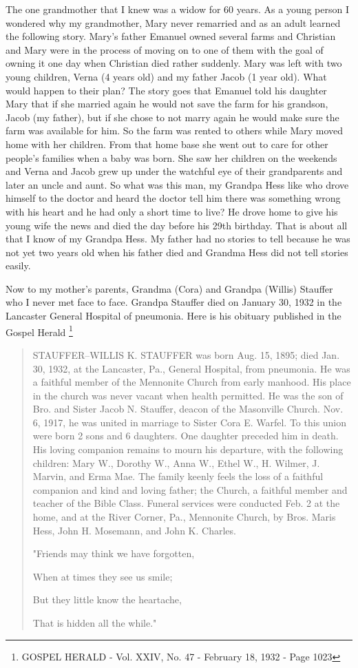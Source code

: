 The one grandmother that I knew was a widow for 60 years.  As a young person I wondered why my grandmother, Mary never remarried and as an adult learned the following story. Mary's father Emanuel owned several farms and Christian and Mary were in the process of moving on to one of them with the goal of owning it one day when Christian died rather suddenly. Mary was left with two young children, Verna (4 years old) and my father Jacob (1 year old). What would happen to their plan? The story goes that Emanuel told his daughter Mary that if she married again he would not save the farm for his grandson, Jacob (my father), but if she chose to not marry again he would make sure the farm was available for him.  So the farm was rented to others while Mary moved home with her children.  From that home base she went out to care for other people's families when a baby was born.  She saw her children on the weekends and Verna and Jacob grew up under the watchful eye of their grandparents and later an uncle and aunt.
So what was this man, my Grandpa Hess like who drove himself to the doctor and heard the doctor tell him there was something wrong with his heart and he had only a short time to live? He drove home to give his young wife the news and died the day before his 29th birthday. That is about all that I know of my Grandpa Hess. My father had no stories to tell because he was not yet two years old when his father died and Grandma Hess did not tell stories easily. 

Now to my mother's parents, Grandma (Cora) and Grandpa (Willis) Stauffer who I never met face to face. Grandpa Stauffer died on January 30, 1932 in the Lancaster General Hospital of pneumonia. Here is his obituary published in the Gospel Herald \footnote{GOSPEL HERALD - Vol. XXIV, No. 47 - February 18, 1932 - Page 1023}
\begin{quotation}
STAUFFER--WILLIS K. STAUFFER was born Aug. 15, 1895; died Jan. 30, 1932, at the Lancaster, Pa., General Hospital, from pneumonia. He was a faithful member of the Mennonite Church from early manhood. His place in the church was never vacant when health permitted. He was the son of Bro. and Sister Jacob N. Stauffer, deacon of the Masonville Church. Nov. 6, 1917, he was united in marriage to Sister Cora E. Warfel. To this union were born 2 sons and 6 daughters. One daughter preceded him in death. His loving companion remains to mourn his departure, with the following children: Mary W., Dorothy W., Anna W., Ethel W., H. Wilmer, J. Marvin, and Erma Mae. The family keenly feels the loss of a faithful companion and kind and loving father; the Church, a faithful member and teacher of the Bible Class. Funeral services were conducted Feb. 2 at the home, and at the River Corner, Pa., Mennonite Church, by Bros. Maris Hess, John H. Mosemann, and John K. Charles.

"Friends may think we have forgotten,

When at times they see us smile;

But they little know the heartache,

That is hidden all the while."
\end{quotation}

